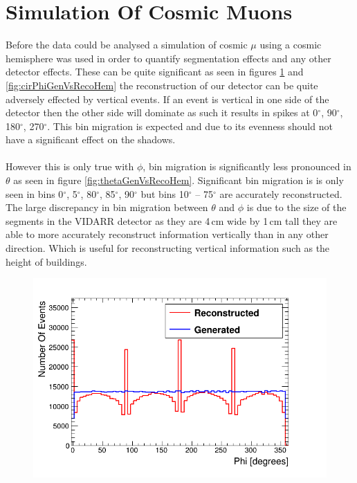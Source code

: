 \section{Simulation Of Cosmic Muons}\label{sec:SimulationOfCosmics}
Before the data could be analysed a simulation of cosmic $\mu$ using a cosmic hemisphere was used in order to quantify segmentation effects and any other detector effects. These can be quite significant as seen in figures \ref{fig:phiGenVsRecoHem} and \ref{fig:cirPhiGenVsRecoHem} the reconstruction of our detector can be quite adversely effected by vertical events. If an event is vertical in one side of the detector then the other side will dominate as such it results in spikes at 0$^\circ$, 90$^\circ$, 180$^\circ$, 270$^\circ$. This bin migration is expected and due to its evenness should not have a significant effect on the shadows. 
\\\\ However this is only true with $\phi$, bin migration is significantly less pronounced in $\theta$ as seen in figure \ref{fig:thetaGenVsRecoHem}. Significant bin migration is is only seen in bins 0$^\circ$, 5$^\circ$, 80$^\circ$, 85$^\circ$, 90$^\circ$ but bins 10$^\circ$ -- 75$^\circ$ are accurately reconstructed. The large discrepancy in bin migration between $\theta$ and $\phi$ is due to the size of the segments in the VIDARR detector as they are 4\,cm wide by 1\,cm tall they are able to more accurately reconstruct information vertically than in any other direction. Which is useful for reconstructing vertical information such as the height of buildings. 
\begin{figure}[H]
 \centering
 \includegraphics[width=0.8\linewidth]{Chapter5/Figs/Raster/hemispherePhiCompare.png}
 \label{fig:phiGenVsRecoHem}
\end{figure}

